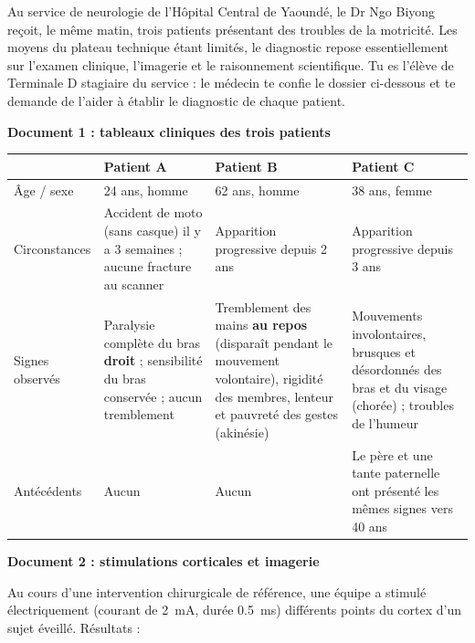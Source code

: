 \documentclass[11pt]{article}
\newcommand{\cle}[1]{{\popxbold\color{popdark}#1}}
\newcounter{popsec}
\newcounter{popsub}
\newcommand{\courssub}[1]{%
  \stepcounter{popsub}%
  \par\vspace{9pt}\noindent{\popxbold\fontsize{11.5}{13}\selectfont\color{popink}{\color{poporange}\thepopsec.\thepopsub}\hspace{6pt}#1}\par\nopagebreak\vspace{4pt}
}
\begin{document}
\courssub{Situation}

Au service de neurologie de l'\cle{Hôpital Central de Yaoundé}, le Dr Ngo Biyong reçoit, le même matin, trois patients présentant des troubles de la motricité. Les moyens du plateau technique étant limités, le diagnostic repose essentiellement sur l'examen clinique, l'imagerie et le raisonnement scientifique. Tu es l'élève de Terminale D stagiaire du service : le médecin te confie le dossier ci-dessous et te demande de l'aider à établir le diagnostic de chaque patient.

\textbf{Document 1 : tableaux cliniques des trois patients}

\begin{center}
\begin{tabularx}{\linewidth}{|l|X|X|X|}
\hline
\rowcolor{popblueL} & \textbf{Patient A} & \textbf{Patient B} & \textbf{Patient C} \\
\hline Âge / sexe & 24 ans, homme & 62 ans, homme & 38 ans, femme \\
\hline Circonstances & Accident de moto (sans casque) il y a 3 semaines ; aucune fracture au scanner & Apparition progressive depuis 2 ans & Apparition progressive depuis 3 ans \\
\hline Signes observés & Paralysie complète du bras \textbf{droit} ; sensibilité du bras conservée ; aucun tremblement & Tremblement des mains \textbf{au repos} (disparaît pendant le mouvement volontaire), rigidité des membres, lenteur et pauvreté des gestes (akinésie) & Mouvements involontaires, brusques et désordonnés des bras et du visage (chorée) ; troubles de l'humeur \\
\hline Antécédents & Aucun & Aucun & Le père et une tante paternelle ont présenté les mêmes signes vers 40 ans \\
\hline
\end{tabularx}
\end{center}

\textbf{Document 2 : stimulations corticales et imagerie}

Au cours d'une intervention chirurgicale de référence, une équipe a stimulé électriquement (courant de \SI{2}{mA}, durée \SI{0,5}{ms}) différents points du cortex d'un sujet éveillé. Résultats :
\end{document}
